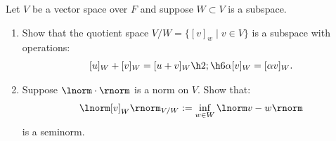 \documentclass[11pt,twoside,openany]{memoir}
\begin{document}
    \begin{exercise}
        Let $V$ be a vector space over $F$ and suppose $W \subset V$ is a subspace.
        \begin{enumerate}[label = (\arabic*),itemsep=1pt,topsep=3pt]
            \item Show that the quotient space $V/W = \{[v]_w \mid v \in V\}$ is a subspace with operations:
                \begin{equation*}
                \begin{split}
                    [u]_W + [v]_W = [u + v]_W \h2 ; \h6 \alpha[v]_W = [\alpha v]_W.
                \end{split}
                \end{equation*}
            \item Suppose $\lnorm \cdot \rnorm$ is a norm on $V$. Show that:
            \begin{equation*}
            \begin{split}
                \lnorm [v]_W \rnorm_{V/W} := \inf_{w \in W}\lnorm v - w \rnorm
            \end{split}
            \end{equation*}
        is a seminorm.
        \end{enumerate}
    \end{exercise}
\end{document}
